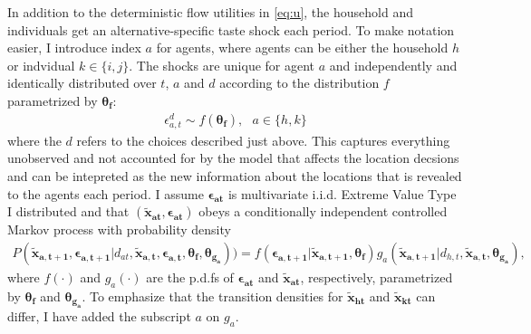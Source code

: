 In addition to the deterministic flow utilities in \eqref{eq:u}, the household and individuals get an alternative-specific taste shock each period. To make notation easier, I introduce index $a$ for agents, where agents can be either the household $h$ or indvidual $k\in\{i,j\}$. The shocks are unique for agent $a$ and independently and identically distributed over $t$, $a$ and $d$ according to the distribution $f$ parametrized by $\boldsymbol{\theta_f}$:
\begin{align}
\epsilon_{a,t}^d \sim f(\boldsymbol{\theta_f}),\text{ }a\in\{h,k\}
\label{eq:shock}
\end{align}
where the $d$ refers to the choices described just above. This captures everything unobserved and not accounted for by the model that affects the location decsions and can be intepreted as the new information about the locations that is revealed to the agents each period. I assume $\boldsymbol{\epsilon_{at}}$ is multivariate i.i.d. Extreme Value Type I distributed and that $(\boldsymbol{\tilde{x}_{at}},\boldsymbol{\epsilon_{at}})$ obeys a conditionally independent controlled Markov process with probability density
\begin{align}
P(\boldsymbol{\tilde{x}_{a,t+1}},\boldsymbol{\epsilon_{a,t+1}}|d_{at},\boldsymbol{\tilde{x}_{a,t}},\boldsymbol{\epsilon_{a,t}},\boldsymbol{\theta_f},\boldsymbol{\theta_{g_a}}))=f(\boldsymbol{\epsilon_{a,t+1}}|\boldsymbol{\tilde{x}_{a,t+1}},\boldsymbol{\theta_f})g_a(\boldsymbol{\tilde{x}_{a,t+1}}|d_{h,t},\boldsymbol{\tilde{x}_{a,t}},\boldsymbol{\theta_{g_a}}),
\label{eq:condi}
\end{align}
where $f(\cdot)$ and $g_a(\cdot)$ are the p.d.fs of $\boldsymbol{\epsilon_{at}}$ and $\boldsymbol{\tilde{x}_{at}}$, respectively, parametrized by $\boldsymbol{\theta_f}$ and $\boldsymbol{\theta_{g_a}}$. To emphasize that the transition densities for $\boldsymbol{\tilde{x}_{ht}}$ and $\boldsymbol{\tilde{x}_{kt}}$ can differ, I have added the subscript $a$ on $g_a$. 

